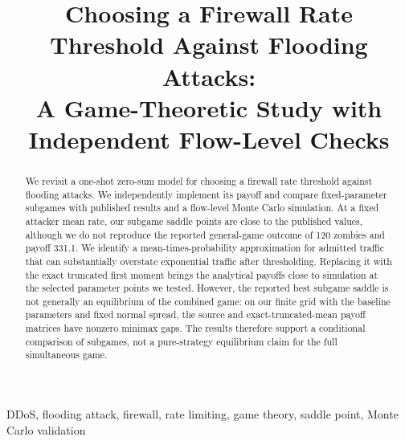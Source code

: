 \documentclass[conference]{IEEEtran}
\begin{document}
\title{Choosing a Firewall Rate Threshold Against Flooding Attacks:\\ A Game-Theoretic Study with Independent Flow-Level Checks}

\author{
\and
{}
\and
{}
\and
{}
}

\maketitle

\begin{abstract}
We revisit a one-shot zero-sum model for choosing a firewall rate threshold against flooding attacks. We independently implement its payoff and compare fixed-parameter subgames with published results and a flow-level Monte Carlo simulation. At a fixed attacker mean rate, our subgame saddle points are close to the published values, although we do not reproduce the reported general-game outcome of 120 zombies and payoff 331.1. We identify a mean-times-probability approximation for admitted traffic that can substantially overstate exponential traffic after thresholding. Replacing it with the exact truncated first moment brings the analytical payoffs close to simulation at the selected parameter points we tested. However, the reported best subgame saddle is not generally an equilibrium of the combined game: on our finite grid with the baseline parameters and fixed normal spread, the source and exact-truncated-mean payoff matrices have nonzero minimax gaps. The results therefore support a conditional comparison of subgames, not a pure-strategy equilibrium claim for the full simultaneous game.
\end{abstract}

\begin{IEEEkeywords}
DDoS, flooding attack, firewall, rate limiting, game theory, saddle point, Monte Carlo validation
\end{IEEEkeywords}
\end{document}
